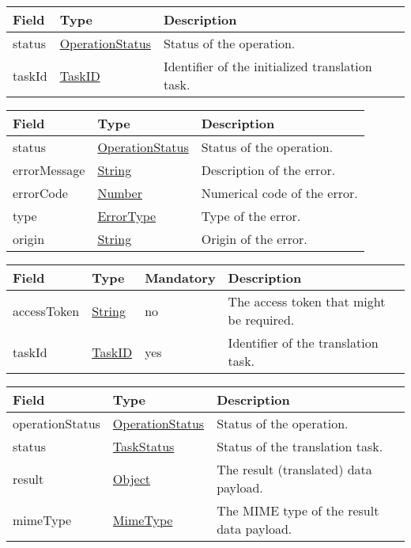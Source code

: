 \documentclass[a4paper]{arrowhead}
\newcommand{\pref}[1]{{\textcolor{ArrowheadGrey}{\hyperref[sec:model:primitives:#1]{#1}}}}
\begin{document}
\begin{table}[ht!]
\begin{tabularx}{\textwidth}{| p{3cm} | p{3cm} | X |} \hline
\rowcolor{gray!33} Field & Type      & Description \\ \hline
status & \pref{OperationStatus} & Status of the operation. \\ \hline
taskId & \pref{TaskID} & Identifier of the initialized translation task. \\ \hline
\end{tabularx}
\end{table}


\begin{table}[ht!]
\begin{tabularx}{\textwidth}{| p{4.25cm} | p{3.5cm} | X |} \hline
\rowcolor{gray!33} Field & Type      & Description \\ \hline
status & \pref{OperationStatus} & Status of the operation. \\ \hline
errorMessage & \pref{String} & Description of the error. \\ \hline
errorCode &\pref{Number}  & Numerical code of the error. \\ \hline
type & \pref{ErrorType} & Type of the error. \\ \hline
origin & \pref{String} & Origin of the error. \\ \hline
\end{tabularx}
\end{table}

 
\begin{table}[ht!]
\begin{tabularx}{\textwidth}{| p{3.6cm} | p{4.9cm} | p{2cm} | X |} \hline
\rowcolor{gray!33} Field & Type & Mandatory & Description \\ \hline
accessToken & \pref{String} & no & The access token that might be required. \\ \hline
taskId & \pref{TaskID} & yes & Identifier of the translation task. \\ \hline
\end{tabularx}
\end{table}

 
\begin{table}[ht!]
\begin{tabularx}{\textwidth}{| p{3cm} | p{3cm} | X |} \hline
\rowcolor{gray!33} Field & Type      & Description \\ \hline
operationStatus & \pref{OperationStatus} & Status of the operation. \\ \hline
status & \pref{TaskStatus} & Status of the translation task. \\ \hline
result & \pref{Object} & The result (translated) data payload. \\ \hline
mimeType & \pref{MimeType} & The MIME type of the result data payload. \\ \hline
\end{tabularx}
\end{table}
\end{document}
